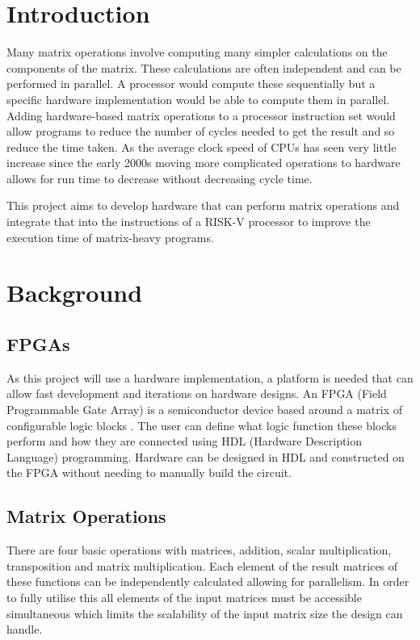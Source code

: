 \documentclass[a4paper,fleqn,12pt]{article}
\begin{document}
	
	
	
	\pagestyle{plain}
	
	\section{Introduction}
	Many matrix operations involve computing many simpler calculations on the components of the matrix. These calculations are often independent and can be performed in parallel. A processor would compute these sequentially but a specific hardware implementation would be able to compute them in parallel. Adding hardware-based matrix operations to a processor instruction set would allow programs to reduce the number of cycles needed to get the result and so reduce the time taken. As the average clock speed of CPUs has seen very little increase since the early 2000s moving more complicated operations to hardware allows for run time to decrease without decreasing cycle time.
	
	This project aims to develop hardware that can perform matrix operations and integrate that into the instructions of a RISK-V processor to improve the execution time of matrix-heavy programs.
	
	\section{Background}
	\subsection{FPGAs}
	As this project will use a hardware implementation, a platform is needed that can allow fast development and iterations on hardware designs. An FPGA (Field Programmable Gate Array) is a semiconductor device based around a matrix of configurable logic blocks \citep{whatisanfpga}. The user can define what logic function these blocks perform and how they are connected using HDL (Hardware Description Language) programming. Hardware can be designed in HDL and constructed on the FPGA without needing to manually build the circuit.
	
	\subsection{Matrix Operations}
	There are four basic operations with matrices, addition, scalar multiplication, transposition and matrix multiplication. Each element of the result matrices of these functions can be independently calculated allowing for parallelism. In order to fully utilise this all elements of the input matrices must be accessible simultaneous which limits the scalability of the input matrix size the design can handle.
	
\end{document}
